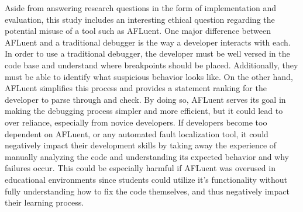 Aside from answering research questions in the form of implementation and
evaluation, this study includes an interesting ethical question regarding the
potential misuse of a tool such as AFLuent. One major difference between AFLuent
and a traditional debugger is the way a developer interacts with each. In order
to use a traditional debugger, the developer must be well versed in the code
base and understand where breakpoints should be placed. Additionally, they must
be able to identify what suspicious behavior looks like. On the other hand,
AFLuent simplifies this process and provides a statement ranking for the
developer to parse through and check. By doing so, AFLuent serves its goal in
making the debugging process simpler and more efficient, but it could lead to
over reliance, especially from novice developers. If developers become too
dependent on AFLuent, or any automated fault localization tool, it could
negatively impact their development skills by taking away the experience of
manually analyzing the code and understanding its expected behavior and why
failures occur. This could be especially harmful if AFLuent was overused in
educational environments since students could utilize it's functionality without
fully understanding how to fix the code themselves, and thus negatively impact
their learning process.

